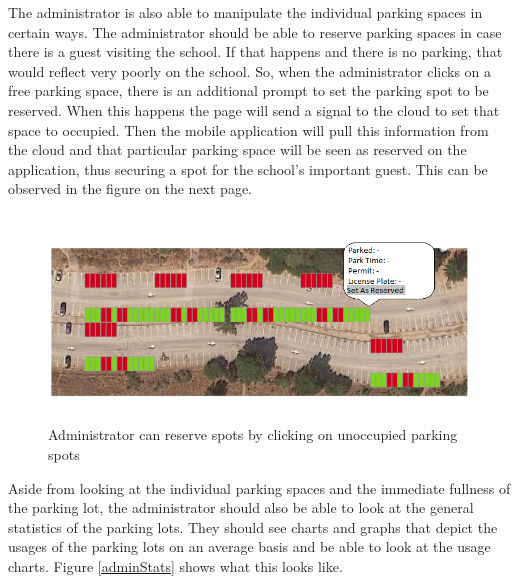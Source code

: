 \documentclass[paper=a4, fontsize=12pt]{scrartcl}
\numberwithin{equation}{section}		%
\numberwithin{figure}{section}			%
\numberwithin{table}{section}				%
\begin{document}
The administrator is also able to manipulate the individual parking spaces in certain ways. The administrator should be able to reserve parking spaces in case there is a guest visiting the school. If that happens and there is no parking, that would reflect very poorly on the school. So, when the administrator clicks on a free parking space, there is an additional prompt to set the parking spot to be reserved. When this happens the page will send a signal to the cloud to set that space to occupied. Then the mobile application will pull this information from the cloud and that particular parking space will be seen as reserved on the application, thus securing a spot for the school's important guest. This can be observed in the figure on the next page.\\

\begin{figure}[H]
\centering
\includegraphics[width=15cm, height=5.5cm]{adminAppPics/lotPicReserve.png}
\caption{Administrator can reserve spots by clicking on unoccupied parking spots}
\label{adminReserve}
\end{figure}

Aside from looking at the individual parking spaces and the immediate fullness of the parking lot, the administrator should also be able to look at the general statistics of the parking lots. They should see charts and graphs that depict the usages of the parking lots on an average basis and be able to look at the usage charts. Figure \ref{adminStats} shows what this looks like.\\
\end{document}
